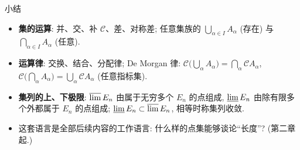 \begin{frame}{小结}

\begin{itemize}
\item \textbf{集的运算}: 并、交、补 $\mathscr{C}$、差、对称差; 任意集族的
$\bigcup_{\alpha \in I} A_\alpha$ (存在) 与 $\bigcap_{\alpha \in I} A_\alpha$ (任意).
\item \textbf{运算律}: 交换、结合、分配律; De Morgan 律:
$\mathscr{C}\big(\bigcup_\alpha A_\alpha\big) = \bigcap_\alpha \mathscr{C} A_\alpha$,
$\mathscr{C}\big(\bigcap_\alpha A_\alpha\big) = \bigcup_\alpha \mathscr{C} A_\alpha$ (任意指标集).
\item \textbf{集列的上、下极限}: $\varlimsup E_n$ 由属于无穷多个 $E_n$ 的点组成,
$\varliminf E_n$ 由除有限多个外都属于 $E_n$ 的点组成; $\varliminf E_n \subset \varlimsup E_n$, 相等时称集列收敛.
\end{itemize}

\pause

\begin{question}
\begin{itemize}
\item 这套语言是全部后续内容的工作语言: 什么样的点集能够谈论``长度''? (第二章起.)
\end{itemize}
\end{question}

\end{frame}


